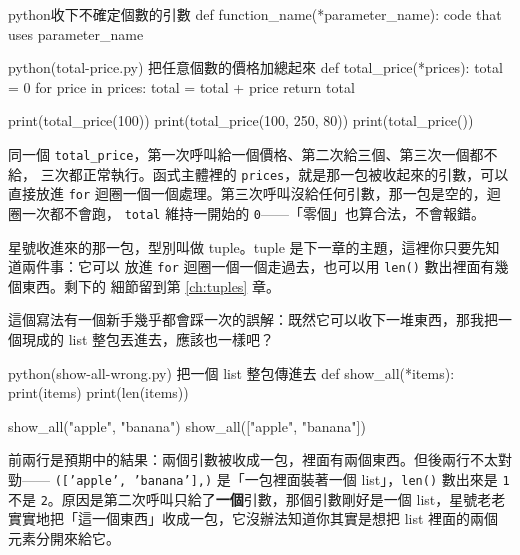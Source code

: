 \begin{code}{python}{收下不確定個數的引數}
def function_name(*parameter_name):
    code that uses parameter_name
\end{code}

\begin{example}{python}{(total-price.py) 把任意個數的價格加總起來}
def total_price(*prices):
    total = 0
    for price in prices:
        total = total + price
    return total


print(total_price(100))
print(total_price(100, 250, 80))
print(total_price())
\end{example}


同一個 \texttt{total\_price}，第一次呼叫給一個價格、第二次給三個、第三次一個都不給，
三次都正常執行。函式主體裡的 \texttt{prices}，就是那一包被收起來的引數，可以直接放進
\texttt{for} 迴圈一個一個處理。第三次呼叫沒給任何引數，那一包是空的，迴圈一次都不會跑，
\texttt{total} 維持一開始的 \texttt{0}——「零個」也算合法，不會報錯。

星號收進來的那一包，型別叫做 tuple。tuple 是下一章的主題，這裡你只要先知道兩件事：它可以
放進 \texttt{for} 迴圈一個一個走過去，也可以用 \texttt{len()} 數出裡面有幾個東西。剩下的
細節留到第 \ref{ch:tuples} 章。


這個寫法有一個新手幾乎都會踩一次的誤解：既然它可以收下一堆東西，那我把一個現成的 list
整包丟進去，應該也一樣吧？

\begin{example}{python}{(show-all-wrong.py) 把一個 list 整包傳進去}
def show_all(*items):
    print(items)
    print(len(items))


show_all("apple", "banana")
show_all(["apple", "banana"])
\end{example}


前兩行是預期中的結果：兩個引數被收成一包，裡面有兩個東西。但後兩行不太對勁——
\texttt{(['apple', 'banana'],)} 是「一包裡面裝著一個 list」，\texttt{len()} 數出來是
\texttt{1} 不是 \texttt{2}。原因是第二次呼叫只給了\textbf{一個}引數，那個引數剛好是一個
list，星號老老實實地把「這一個東西」收成一包，它沒辦法知道你其實是想把 list 裡面的兩個
元素分開來給它。

